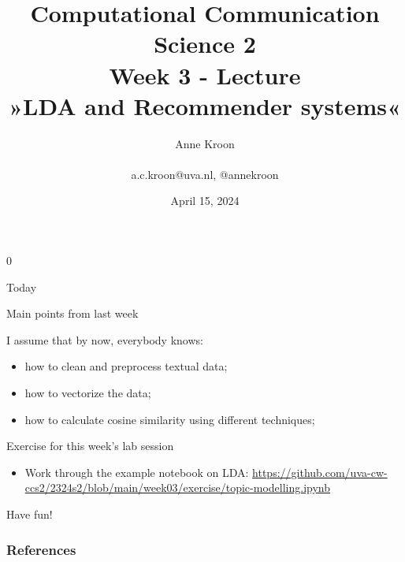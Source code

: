 \documentclass[handout]{beamer}
\title[Computational Communication Science 2]{\textbf{Computational Communication Science 2} \\Week 3 - Lecture\\ »LDA and Recommender systems«}
\author[Anne Kroon]{Anne Kroon \\ ~ \\ \footnotesize{ a.c.kroon@uva.nl, @annekroon} \\}
\date{April 15, 2024}
\institute[Digital Society Minor, University of Amsterdam]{Digital Society Minor, University of Amsterdam}
\begin{document}
	
	\begin{frame}{}
		\titlepage
	\end{frame}
	0
	\begin{frame}{Today}
		\begin{tiny}
		\tableofcontents
		\end{tiny}
	\end{frame}



	\begin{frame}{Main points from last week}
		\begin{alertblock}{I assume that by now, everybody knows:}
			\begin{itemize}[<+>]
				\item how to clean and preprocess textual data;
				\item how to vectorize the data;
				\item how to calculate cosine similarity using different techniques;
			\end{itemize}
		\end{alertblock}
	\end{frame}



\begin{frame}[plain]
	
	\begin{block}{Exercise for this week's lab session}
		\footnotesize
		\begin{itemize}
			\item Work through the example notebook on LDA: \url{https://github.com/uva-cw-ccs2/2324s2/blob/main/week03/exercise/topic-modelling.ipynb}
			\end{itemize}
	\end{block}
\end{frame}



\begin{frame}[standout]
Have fun!
\end{frame}

\begin{frame}[t,allowframebreaks]
	\frametitle{References}
	\printbibliography
\end{frame}
\end{document}
